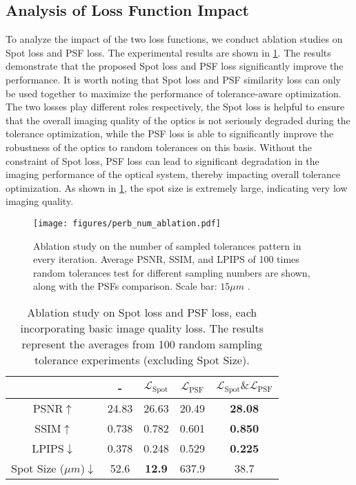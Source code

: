 \subsection{Analysis of Loss Function Impact}
To analyze the impact of the two loss functions, we conduct ablation studies on Spot loss and PSF loss. The experimental results are shown in \cref{tab:loss_comparison}. The results demonstrate that the proposed Spot loss and PSF loss significantly improve the performance. It is worth noting that Spot loss and PSF similarity loss can only be used together to maximize the performance of tolerance-aware optimization. The two losses play different roles respectively, the Spot loss is helpful to ensure that the overall imaging quality of the optics is not seriously degraded during the tolerance optimization, while the PSF loss is able to significantly improve the robustness of the optics to random tolerances on this basis. Without the constraint of Spot loss, PSF loss can lead to significant degradation in the imaging performance of the optical system, thereby impacting overall tolerance optimization. As shown in \cref{tab:loss_comparison}, the spot size is extremely large, indicating very low imaging quality.
\begin{figure}[t]
  \centering
   \texttt{[image: figures/perb\_num\_ablation.pdf]}

   \caption{Ablation study on the number of sampled tolerances pattern in every iteration. Average PSNR, SSIM, and LPIPS of 100 times random tolerances test for different sampling numbers are shown, along with the PSFs comparison. Scale bar: $15\mu m$ .}
   \label{fig:perb_num}
\end{figure}

\begin{table}
\centering
\caption{Ablation study on Spot loss and PSF loss, each incorporating basic image quality loss. The results represent the averages from 100 random sampling tolerance experiments (excluding Spot Size).}
\begin{tabular}{c|c c c c}
\hline
 & - & $\mathcal{L}_{\text{Spot}}$ & $\mathcal{L}_{\text{PSF}}$ & $\mathcal{L}_{\text{Spot}}\&\mathcal{L}_{\text{PSF}}$ \\
\hline
PSNR$\uparrow$ & 24.83 & 26.63 & 20.49 & \bf{28.08} \\
SSIM$\uparrow$ & 0.738 & 0.782 & 0.601 & \bf{0.850} \\
LPIPS$\downarrow$ & 0.378 & 0.248 & 0.529 & \bf{0.225} \\
Spot Size ($\mu m$)$\downarrow$ & 52.6 & \bf{12.9} & 637.9 & 38.7 \\
\hline
\end{tabular}
\label{tab:loss_comparison}
\end{table}

